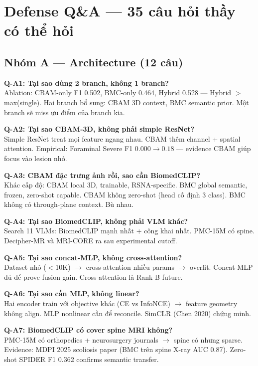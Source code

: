 \documentclass[11pt,a4paper]{article}
\begin{document}
\section{Defense Q\&A — 35 câu hỏi thầy có thể hỏi}

\subsection*{Nhóm A — Architecture (12 câu)}

\textbf{Q-A1: Tại sao dùng 2 branch, không 1 branch?}\\
Ablation: CBAM-only F1 0.502, BMC-only 0.464, Hybrid 0.528 ---
Hybrid $>$ max(single). Hai branch bổ sung: CBAM 3D context, BMC
semantic prior. Một branch sẽ miss ưu điểm của branch kia.

\textbf{Q-A2: Tại sao CBAM-3D, không phải simple ResNet?}\\
Simple ResNet treat mọi feature ngang nhau. CBAM thêm channel +
spatial attention. Empirical: Foraminal Severe F1 $0.000 \to 0.18$
--- evidence CBAM giúp focus vào lesion nhỏ.

\textbf{Q-A3: CBAM đặc trưng ảnh rồi, sao cần BiomedCLIP?}\\
Khác cấp độ: CBAM local 3D, trainable, RSNA-specific. BMC global
semantic, frozen, zero-shot capable. CBAM không zero-shot (head cố
định 3 class). BMC không có through-plane context. Bù nhau.

\textbf{Q-A4: Tại sao BiomedCLIP, không phải VLM khác?}\\
Search 11 VLMs: BiomedCLIP mạnh nhất + công khai nhất. PMC-15M có
spine. Decipher-MR và MRI-CORE ra sau experimental cutoff.

\textbf{Q-A5: Tại sao concat-MLP, không cross-attention?}\\
Dataset nhỏ ($<$10K) $\to$ cross-attention nhiều params $\to$ overfit.
Concat-MLP đủ để prove fusion gain. Cross-attention là Rank-B future.

\textbf{Q-A6: Tại sao cần MLP, không linear?}\\
Hai encoder train với objective khác (CE vs InfoNCE) $\to$ feature
geometry không align. MLP nonlinear cần để reconcile. SimCLR (Chen
2020) chứng minh.

\textbf{Q-A7: BiomedCLIP có cover spine MRI không?}\\
PMC-15M có orthopedics + neurosurgery journals $\to$ spine có nhưng
sparse. Evidence: MDPI 2025 scoliosis paper (BMC trên spine X-ray AUC
0.87). Zero-shot SPIDER F1 0.362 confirms semantic transfer.
\end{document}
